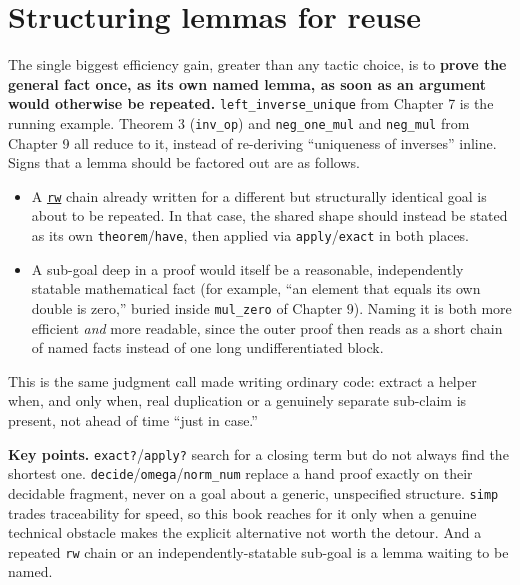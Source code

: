 \section{Structuring lemmas for reuse}\label{sec:12-working-efficiently:05-structuring-lemmas:1}

The single biggest efficiency gain, greater than any tactic choice, is to \textbf{prove the general fact once, as its own named lemma, as soon as an argument would otherwise be repeated.} \texttt{left\_\allowbreak{}inverse\_\allowbreak{}unique} from Chapter 7 is the running example. Theorem 3 (\texttt{inv\_\allowbreak{}op}) and \texttt{neg\_\allowbreak{}one\_\allowbreak{}mul} and \texttt{neg\_\allowbreak{}mul} from Chapter 9 all reduce to it, instead of re-deriving ``uniqueness of inverses'' inline. Signs that a lemma should be factored out are as follows.

\begin{itemize}
\tightlist
\item
  A \href{https://lean-lang.org/doc/reference/latest/Tactic-Proofs/Tactic-Reference/}{\texttt{rw}} chain already written for a different but structurally identical goal is about to be repeated. In that case, the shared shape should instead be stated as its own \texttt{theorem}/\texttt{have}, then applied via \texttt{apply}/\texttt{exact} in both places.
\item
  A sub-goal deep in a proof would itself be a reasonable, independently statable mathematical fact (for example, ``an element that equals its own double is zero,'' buried inside \texttt{mul\_\allowbreak{}zero} of Chapter 9). Naming it is both more efficient \emph{and} more readable, since the outer proof then reads as a short chain of named facts instead of one long undifferentiated block.
\end{itemize}

This is the same judgment call made writing ordinary code: extract a helper when, and only when, real duplication or a genuinely separate sub-claim is present, not ahead of time ``just in case.''

\textbf{Key points.} \texttt{exact?}/\texttt{apply?} search for a closing term but do not always find the shortest one. \texttt{decide}/\texttt{omega}/\texttt{norm\_\allowbreak{}num} replace a hand proof exactly on their decidable fragment, never on a goal about a generic, unspecified structure. \texttt{simp} trades traceability for speed, so this book reaches for it only when a genuine technical obstacle makes the explicit alternative not worth the detour. And a repeated \texttt{rw} chain or an independently-statable sub-goal is a lemma waiting to be named.

